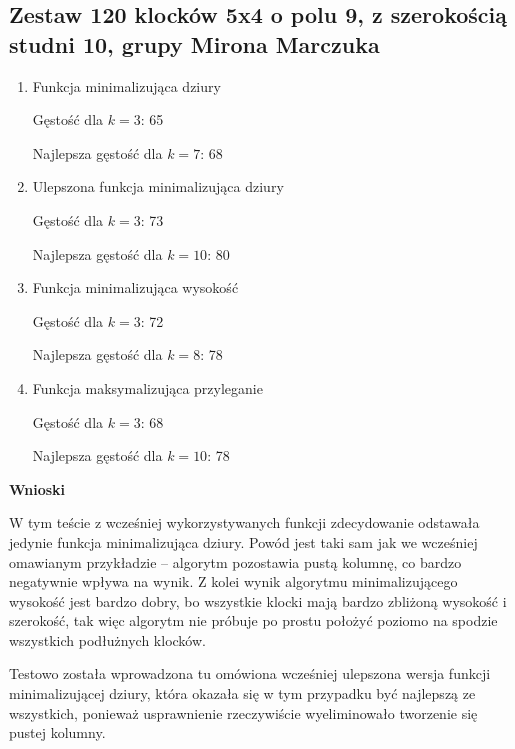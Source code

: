 \documentclass{article}
\begin{document}
\subsection{Zestaw 120 klocków 5x4 o polu 9, z szerokością studni 10, grupy Mirona Marczuka}
\begin{enumerate}

\item Funkcja minimalizująca dziury

Gęstość dla $k=3$: 65

Najlepsza gęstość dla $k=7$: 68

\item Ulepszona funkcja minimalizująca dziury

Gęstość dla $k=3$: 73

Najlepsza gęstość dla $k=10$: 80

\item Funkcja minimalizująca wysokość

Gęstość dla $k=3$: 72

Najlepsza gęstość dla $k=8$: 78

\item Funkcja maksymalizująca przyleganie

Gęstość dla $k=3$: 68

Najlepsza gęstość dla $k=10$: 78

\end{enumerate}
\textbf{Wnioski}

W tym teście z wcześniej wykorzystywanych funkcji zdecydowanie odstawała jedynie funkcja minimalizująca dziury. Powód jest taki sam jak we wcześniej omawianym przykładzie -- algorytm pozostawia pustą kolumnę, co bardzo negatywnie wpływa na wynik. Z kolei wynik algorytmu minimalizującego wysokość jest bardzo dobry, bo wszystkie klocki mają bardzo zbliżoną wysokość i szerokość, tak więc algorytm nie próbuje po prostu położyć poziomo na spodzie wszystkich podłużnych klocków.

Testowo została wprowadzona tu omówiona wcześniej ulepszona wersja funkcji minimalizującej dziury, która okazała się w tym przypadku być najlepszą ze wszystkich, ponieważ usprawnienie rzeczywiście wyeliminowało tworzenie się pustej kolumny.
\end{document}
